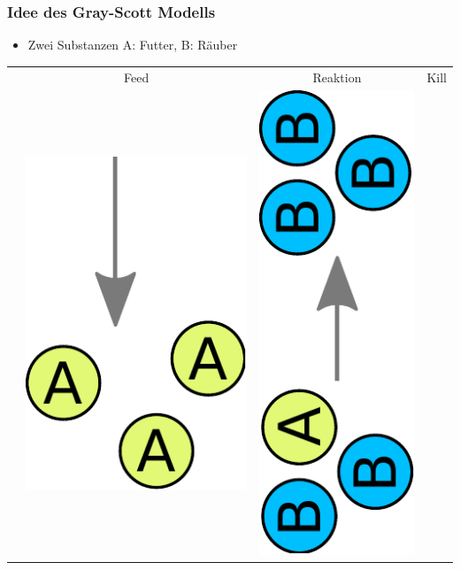 \documentclass[12pt]{beamer}
\begin{document}
    \begin{frame}
      \frametitle{Idee des Gray-Scott Modells}
      \begin{itemize}
      \item Zwei Substanzen A: Futter, B: Räuber
      \renewcommand{\arraystretch}{0.1}
      \setlength{\tabcolsep}{0.2em} %
      \end{itemize}
      
      \begin{tabular}{ r c c c }
	  & Feed & Reaktion & Kill \\
	  &
      \includegraphics[scale=0.15]{Bilder/gs_feed.pdf}
	  &
      \includegraphics[scale=0.15,angle=-90,origin=c]{Bilder/gs_reaction.pdf}

\end{tabular}
\end{frame}
\end{document}

